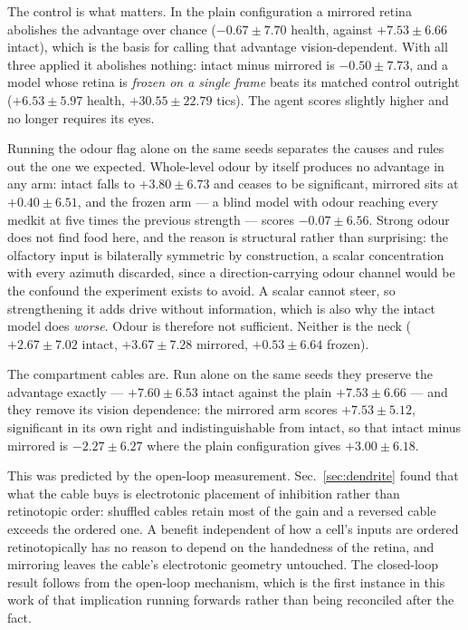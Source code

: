 \documentclass[10pt,twoside]{article}
\begin{document}
The control is what matters. In the plain configuration a mirrored retina
abolishes the advantage over chance ($-0.67\pm7.70$ health, against
$+7.53\pm6.66$ intact), which is the basis for calling that advantage
vision-dependent. With all three applied it abolishes nothing: intact minus
mirrored is $-0.50\pm7.73$, and a model whose retina is \emph{frozen on a
single frame} beats its matched control outright ($+6.53\pm5.97$ health,
$+30.55\pm22.79$ tics). The agent scores slightly higher and no longer requires
its eyes.

Running the odour flag alone on the same seeds separates the causes and rules
out the one we expected. Whole-level odour by itself produces no advantage in any
arm: intact falls to $+3.80\pm6.73$ and ceases to be significant, mirrored sits
at $+0.40\pm6.51$, and the frozen arm --- a blind model with odour reaching
every medkit at five times the previous strength --- scores $-0.07\pm6.56$.
Strong odour does not find food here, and the reason is structural rather than
surprising: the olfactory input is bilaterally symmetric by construction, a
scalar concentration with every azimuth discarded, since a direction-carrying
odour channel would be the confound the experiment exists to avoid. A scalar
cannot steer, so strengthening it adds drive without information, which is also
why the intact model does \emph{worse}. Odour is therefore not sufficient. Neither is the
neck ($+2.67\pm7.02$ intact, $+3.67\pm7.28$ mirrored, $+0.53\pm6.64$ frozen).

The compartment cables are. Run alone on the same seeds they preserve the
advantage exactly --- $+7.60\pm6.53$ intact against the plain
$+7.53\pm6.66$ --- and they remove its vision dependence: the mirrored arm
scores $+7.53\pm5.12$, significant in its own right and indistinguishable from
intact, so that intact minus mirrored is $-2.27\pm6.27$ where the plain
configuration gives $+3.00\pm6.18$.

This was predicted by the open-loop measurement. Sec.~\ref{sec:dendrite} found
that what the cable buys is electrotonic placement of inhibition rather than
retinotopic order: shuffled cables retain most of the gain and a reversed cable
exceeds the ordered one. A benefit independent of how a cell's inputs are
ordered retinotopically has no reason to depend on the handedness of the
retina, and mirroring leaves the cable's electrotonic geometry untouched. The
closed-loop result follows from the open-loop mechanism, which is the first
instance in this work of that implication running forwards rather than being
reconciled after the fact.
\end{document}
